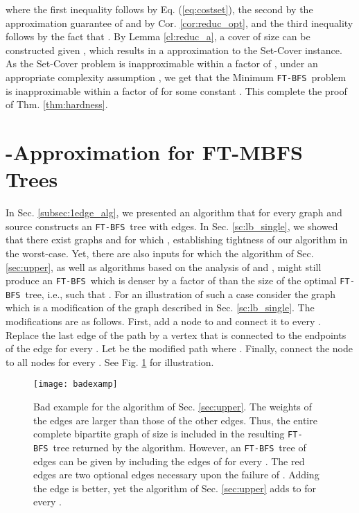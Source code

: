 \documentclass[12pt]{article}
\def\FTBFS{\mbox{\tt FT-BFS}}
\begin{document}
where the first inequality follows by Eq. (\ref{eq:costset}), the second by the approximation guarantee of  and by Cor. \ref{cor:reduc_opt}, and the third inequality follows by the fact that .
By Lemma \ref{cl:reduc_a}, a cover of size  can be constructed given , which results in a  approximation to the Set-Cover instance. As the Set-Cover problem is inapproximable within a factor of , under an appropriate complexity assumption \cite{Feige98}, we get that the Minimum \FTBFS\ problem is inapproximable within a factor of  for some constant .
This complete the proof of Thm. \ref{thm:hardness}.



\section{-Approximation for FT-MBFS Trees}
\label{sec:approx}
In Sec. \ref{subsec:1edge_alg}, we presented an algorithm that for every graph  and source  constructs an \FTBFS\ tree
 with  edges.
In Sec. \ref{sc:lb_single},
we showed that there exist graphs  and  for which , establishing tightness of our algorithm in the worst-case.
Yet, there are also inputs  for which the algorithm of Sec. \ref{sec:upper}, as well as algorithms based on the analysis of \cite{GW12} and \cite{RTREP05}, might still produce an \FTBFS\
 which is denser by a factor of
 than the size of the optimal \FTBFS\ tree, i.e., such that .
For an illustration of such a case consider the graph  which is a modification of the graph  described in
Sec. \ref{sc:lb_single}.
The modifications are as follows.
First, add a node  to  and connect it to every .
Replace the last edge  of the  path  by a
vertex  that is connected to the endpoints of the edge 
for every .
Let  be the  modified path where .
Finally, connect the node  to all nodes  for every .
See Fig. \ref{fig:badexamp} for illustration.

\begin{figure}[h!]
\begin{center}
\texttt{[image: badexamp]}
\caption{Bad example for the algorithm of Sec. \ref{sec:upper}.
The weights of the  edges are larger than those of the other edges. Thus, the entire complete bipartite graph  of
size  is included in the resulting \FTBFS\ tree
 returned by the algorithm.
However, an \FTBFS\ tree  of  edges
can be given by including the edges of  for every .
The red edges are two optional edges necessary upon the failure of . Adding the edge  is better, yet the algorithm of Sec. \ref{sec:upper} adds  to  for every .
\label{fig:badexamp}}
\end{center}
\end{figure}
\end{document}
